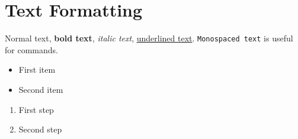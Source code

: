 \documentclass{article}
\begin{document}
\section{Text Formatting}
Normal text, \textbf{bold text}, \textit{italic text}, \underline{underlined text}.
\texttt{Monospaced text} is useful for commands.
\begin{itemize}
\item First item
\item Second item
\end{itemize}
\begin{enumerate}
\item First step
\item Second step
\end{enumerate}
\end{document}
